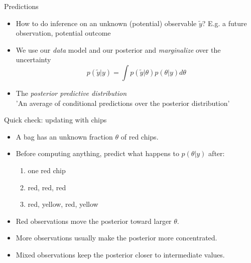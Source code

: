 \documentclass[10pt]{beamer}
\begin{document}
\begin{frame}{Predictions}
  \begin{itemize}
  \item How to do inference on an unknown (potential) observable $\tilde{y}$? E.g. a future observation, potential outcome
  \pause
  \item We use our \emph{data} model and our posterior and \emph{marginalize} over the uncertainty
  \[
  p(\tilde{y}|y) = \int p(\tilde{y}|\theta) p(\theta|y) d\theta
  \]
  \item The \emph{posterior predictive distribution}
  \\ 'An average of conditional predictions over the posterior distribution'
  \end{itemize}
\end{frame}


\begin{frame}{Quick check: updating with chips}

  \begin{itemize}
  \item A bag has an unknown fraction $\theta$ of red chips.
  \item Before computing anything, predict what happens to $p(\theta|y)$ after:
    \begin{enumerate}
    \item one red chip
    \item red, red, red
    \item red, yellow, red, yellow
    \end{enumerate}
  \pause
  \item Red observations move the posterior toward larger $\theta$.
  \item More observations usually make the posterior more concentrated.
  \item Mixed observations keep the posterior closer to intermediate values.
  \end{itemize}

\end{frame}
\end{document}

